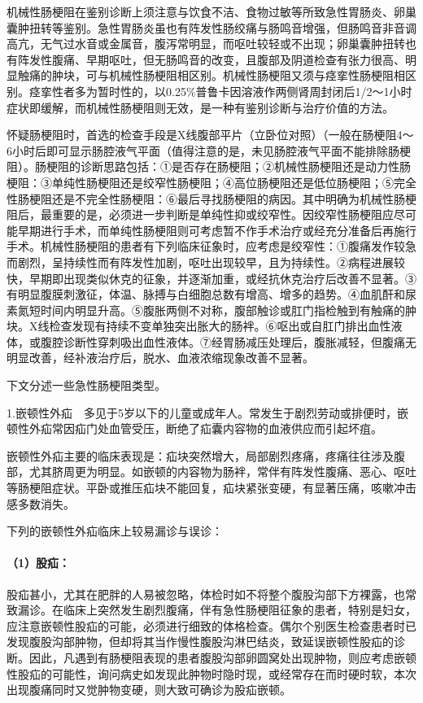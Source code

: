 机械性肠梗阻在鉴别诊断上须注意与饮食不洁、食物过敏等所致急性胃肠炎、卵巢囊肿扭转等鉴别。急性胃肠炎虽也有阵发性肠绞痛与肠鸣音增强，但肠鸣音非音调高亢，无气过水音或金属音，腹泻常明显，而呕吐较轻或不出现；卵巢囊肿扭转也有阵发性腹痛、早期呕吐，但无肠鸣音的改变，且腹部及阴道检查有张力很高、明显触痛的肿块，可与机械性肠梗阻相区别。机械性肠梗阻又须与痉挛性肠梗阻相区别。痉挛性者多为暂时性的，以0.25\%普鲁卡因溶液作两侧肾周封闭后1/2～1小时症状即缓解，而机械性肠梗阻则无效，是一种有鉴别诊断与治疗价值的方法。

怀疑肠梗阻时，首选的检查手段是X线腹部平片（立卧位对照）（一般在肠梗阻4～6小时后即可显示肠腔液气平面（值得注意的是，未见肠腔液气平面不能排除肠梗阻）。肠梗阻的诊断思路包括：①是否存在肠梗阻；②机械性肠梗阻还是动力性肠梗阻：③单纯性肠梗阻还是绞窄性肠梗阻；④高位肠梗阻还是低位肠梗阻；⑤完全性肠梗阻还是不完全性肠梗阻：⑥最后寻找肠梗阻的病因。其中明确为机械性肠梗阻后，最重要的是，必须进一步判断是单纯性抑或绞窄性。因绞窄性肠梗阻应尽可能早期进行手术，而单纯性肠梗阻则可考虑暂不作手术治疗或经充分准备后再施行手术。机械性肠梗阻的患者有下列临床征象时，应考虑是绞窄性：①腹痛发作较急而剧烈，呈持续性而有阵发性加剧，呕吐出现较早，且为持续性。②病程进展较快，早期即出现类似休克的征象，并逐渐加重，或经抗休克治疗后改善不显著。③有明显腹膜刺激征，体温、脉搏与白细胞总数有增高、增多的趋势。④血肌酐和尿素氮短时间内明显升高。⑤腹胀两侧不对称，腹部触诊或肛门指检触到有触痛的肿块。X线检查发现有持续不变单独突出胀大的肠袢。⑥呕出或自肛门排出血性液体，或腹腔诊断性穿刺吸出血性液体。⑦经胃肠减压处理后，腹胀减轻，但腹痛无明显改善，经补液治疗后，脱水、血液浓缩现象改善不显著。

下文分述一些急性肠梗阻类型。

1.嵌顿性外疝　多见于5岁以下的儿童或成年人。常发生于剧烈劳动或排便时，嵌顿性外疝常因疝门处血管受压，断绝了疝囊内容物的血液供应而引起坏疽。

嵌顿性外疝主要的临床表现是：疝块突然增大，局部剧烈疼痛，疼痛往往涉及腹部，尤其脐周更为明显。如嵌顿的内容物为肠袢，常伴有阵发性腹痛、恶心、呕吐等肠梗阻症状。平卧或推压疝块不能回复，疝块紧张变硬，有显著压痛，咳嗽冲击感多数消失。

下列的嵌顿性外疝临床上较易漏诊与误诊：

\paragraph{（1）股疝：}

股疝甚小，尤其在肥胖的人易被忽略，体检时如不将整个腹股沟部下方裸露，也常致漏诊。在临床上突然发生剧烈腹痛，伴有急性肠梗阻征象的患者，特别是妇女，应注意嵌顿性股疝的可能，必须进行细致的体格检查。偶尔个别医生检查患者时已发现腹股沟部肿物，但却将其当作慢性腹股沟淋巴结炎，致延误嵌顿性股疝的诊断。因此，凡遇到有肠梗阻表现的患者腹股沟部卵圆窝处出现肿物，则应考虑嵌顿性股疝的可能性，询问病史如发现此肿物时隐时现，或经常存在而时硬时软，本次出现腹痛同时又觉肿物变硬，则大致可确诊为股疝嵌顿。

